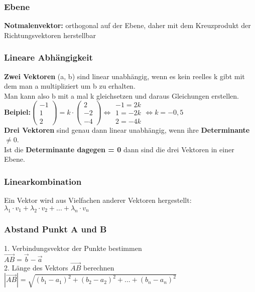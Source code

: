 \documentclass[6pt,a4paper]{scrartcl}
\newcommand{\abs}[1]{\ensuremath{\left\vert#1\right\vert}}
\begin{document}
\begin{multicols*}{3}
\subsubsection{Ebene}
\textbf{Notmalenvektor:} orthogonal auf der Ebene, daher mit dem Kreuzprodukt der Richtungsvektoren herstellbar\\

\subsubsection{Lineare Abhängigkeit}
\textbf{Zwei Vektoren} (a, b) sind linear unabhängig, wenn es kein reelles k gibt mit dem man a multipliziert um b zu erhalten.\\
Man kann also b mit a mal k gleichsetzen und daraus Gleichungen erstellen.\\
\textbf{Beipiel:}$\begin{pmatrix}-1\\1\\2\end{pmatrix}=k\cdot \begin{pmatrix}2\\-2\\-4\end{pmatrix} \Leftrightarrow \begin{matrix}-1 = 2k\\1 = -2k\\2 = -4k\end{matrix}\Leftrightarrow k=-0,5
$\\
\textbf{Drei Vektoren} sind genau dann linear unabhängig, wenn ihre \textbf{Determinante $\neq 0$}. 
\\
Ist die \textbf{Determinante dagegen = 0} dann sind die drei Vektoren in einer Ebene.
\subsubsection{Linearkombination}
Ein Vektor wird aus Vielfachen anderer Vektoren hergestellt:\\
${\lambda}_{1}\cdot v_1 + {\lambda}_{2}\cdot v_2 + ... + {\lambda}_{n} \cdot v_n$

\subsubsection{Abstand Punkt A und B}
1. Verbindungsvektor der Punkte bestimmen\\
$\overrightarrow{AB} = \overrightarrow{b} - \overrightarrow{a}$
\\
2. Länge des Vektors $\overrightarrow{AB}$ berechnen\\
$\abs{\overrightarrow{AB}} = \sqrt{(b_1-a_1)^2 + (b_2-a_2)^2 + ... + (b_n-a_n)^2}$\\

\end{multicols*}
\end{document}
